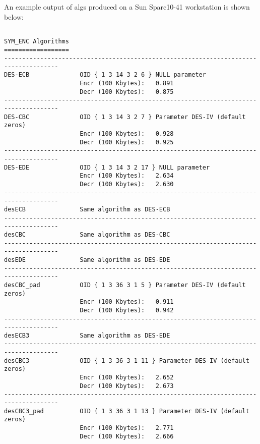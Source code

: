 An example output of algs produced on a Sun Sparc10-41 workstation is shown below:
{\small
\begin{verbatim}

SYM_ENC Algorithms
==================
-------------------------------------------------------------------------------------
DES-ECB              OID { 1 3 14 3 2 6 } NULL parameter
                     Encr (100 Kbytes):   0.891  
                     Decr (100 Kbytes):   0.875  
-------------------------------------------------------------------------------------
DES-CBC              OID { 1 3 14 3 2 7 } Parameter DES-IV (default zeros)
                     Encr (100 Kbytes):   0.928  
                     Decr (100 Kbytes):   0.925  
-------------------------------------------------------------------------------------
DES-EDE              OID { 1 3 14 3 2 17 } NULL parameter
                     Encr (100 Kbytes):   2.634  
                     Decr (100 Kbytes):   2.630  
-------------------------------------------------------------------------------------
desECB               Same algorithm as DES-ECB
-------------------------------------------------------------------------------------
desCBC               Same algorithm as DES-CBC
-------------------------------------------------------------------------------------
desEDE               Same algorithm as DES-EDE
-------------------------------------------------------------------------------------
desCBC_pad           OID { 1 3 36 3 1 5 } Parameter DES-IV (default zeros)
                     Encr (100 Kbytes):   0.911  
                     Decr (100 Kbytes):   0.942  
-------------------------------------------------------------------------------------
desECB3              Same algorithm as DES-EDE
-------------------------------------------------------------------------------------
desCBC3              OID { 1 3 36 3 1 11 } Parameter DES-IV (default zeros)
                     Encr (100 Kbytes):   2.652  
                     Decr (100 Kbytes):   2.673  
-------------------------------------------------------------------------------------
desCBC3_pad          OID { 1 3 36 3 1 13 } Parameter DES-IV (default zeros)
                     Encr (100 Kbytes):   2.771  
                     Decr (100 Kbytes):   2.666  


\end{verbatim}}
